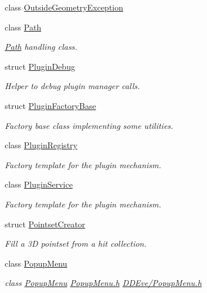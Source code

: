 \begin{DoxyCompactItemize}
class \hyperlink{class_d_d4hep_1_1_outside_geometry_exception}{Outside\+Geometry\+Exception}
\item 
class \hyperlink{class_d_d4hep_1_1_path}{Path}
\begin{DoxyCompactList}\small\item\em \hyperlink{class_d_d4hep_1_1_path}{Path} handling class. \end{DoxyCompactList}\item 
struct \hyperlink{struct_d_d4hep_1_1_plugin_debug}{Plugin\+Debug}
\begin{DoxyCompactList}\small\item\em Helper to debug plugin manager calls. \end{DoxyCompactList}\item 
struct \hyperlink{struct_d_d4hep_1_1_plugin_factory_base}{Plugin\+Factory\+Base}
\begin{DoxyCompactList}\small\item\em Factory base class implementing some utilities. \end{DoxyCompactList}\item 
class \hyperlink{class_d_d4hep_1_1_plugin_registry}{Plugin\+Registry}
\begin{DoxyCompactList}\small\item\em Factory template for the plugin mechanism. \end{DoxyCompactList}\item 
class \hyperlink{class_d_d4hep_1_1_plugin_service}{Plugin\+Service}
\begin{DoxyCompactList}\small\item\em Factory template for the plugin mechanism. \end{DoxyCompactList}\item 
struct \hyperlink{struct_d_d4hep_1_1_pointset_creator}{Pointset\+Creator}
\begin{DoxyCompactList}\small\item\em Fill a 3D pointset from a hit collection. \end{DoxyCompactList}\item 
class \hyperlink{class_d_d4hep_1_1_popup_menu}{Popup\+Menu}
\begin{DoxyCompactList}\small\item\em class \hyperlink{class_d_d4hep_1_1_popup_menu}{Popup\+Menu} \hyperlink{_popup_menu_8h}{Popup\+Menu.\+h} \hyperlink{_popup_menu_8h}{D\+D\+Eve/\+Popup\+Menu.\+h} \end{DoxyCompactList}\item 

\end{DoxyCompactItemize}
